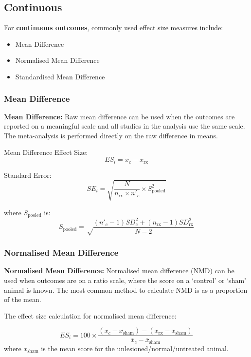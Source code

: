 \documentclass[
]{book}
\providecommand{\tightlist}{%
  \setlength{\itemsep}{0pt}\setlength{\parskip}{0pt}}
\begin{document}
\subsection{Continuous}\label{continuous}

For \textbf{continuous outcomes}, commonly used effect size measures include:

\begin{itemize}
\tightlist
\item
  Mean Difference
\item
  Normalised Mean Difference
\item
  Standardised Mean Difference
\end{itemize}

\subsubsection{Mean Difference}\label{mean-difference}

\textbf{Mean Difference:} Raw mean difference can be used when the outcomes are reported on a meaningful scale and all studies in the analysis use the same scale. The meta-analysis is performed directly on the raw difference in means.

Mean Difference Effect Size:
\[ ES_i = \bar{x}_c - \bar{x}_\text{rx}\]

Standard Error:
\[ SE_i = \sqrt{\frac {N}{n_{\text{rx}} \times n'_c} \times S_{\text{pooled}}^2} \]

where \(S_{\text{pooled}}\) is:
\[S_{\text{pooled}} = \sqrt \frac {(n'_c - 1)SD_c^2 + (n_{\text{rx}} - 1)SD_{\text{rx}}^2}{N -2} \]

\subsubsection{Normalised Mean Difference}\label{normalised-mean-difference}

\textbf{Normalised Mean Difference:} Normalised mean difference (NMD) can be used when outcomes are on a ratio scale, where the score on a `control' or `sham' animal is known. The most common method to calculate NMD is as a proportion of the mean.

The effect size calculation for normalised mean difference:

\[ES_i= 100 \times  \frac {(\bar{x}_c - \bar{x}_\text{sham}) - (\bar{x}_\text{rx} - \bar{x}_\text{sham})}{\bar{x}_c - \bar{x}_\text{sham}}\] where \(\bar{x}_\text{sham}\) is the mean score for the unlesioned/normal/untreated animal.
\end{document}
